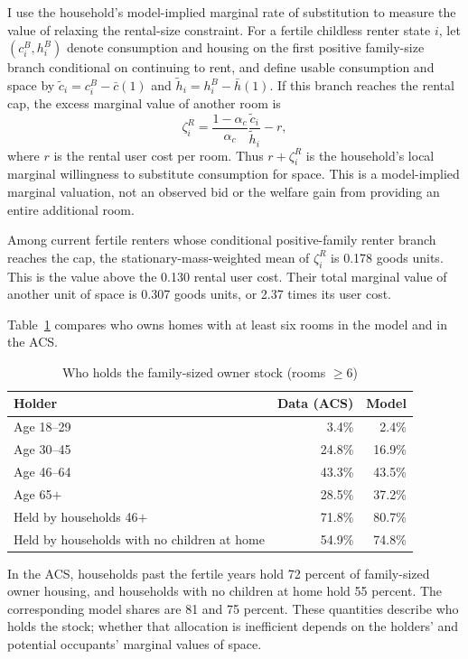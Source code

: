 \documentclass[11pt]{article}
\theoremstyle{definition}
\newcommand{\1}{\mathbf 1}
\begin{document}
I use the household's model-implied marginal rate of substitution to measure
the value of relaxing the rental-size constraint. For a fertile childless
renter state $i$, let $(c_i^B,h_i^B)$ denote consumption and housing on the
first positive family-size branch conditional on continuing to rent, and
define usable consumption and space by
$\widetilde c_i=c_i^B-\bar c(1)$ and
$\widetilde h_i=h_i^B-\bar h(1)$. If this branch reaches the rental cap,
the excess marginal value of another room is
\[
\zeta_i^R
=
\frac{1-\alpha_c}{\alpha_c}
\frac{\widetilde c_i}{\widetilde h_i}-r,
\]
where $r$ is the rental user cost per room. Thus $r+\zeta_i^R$ is the
household's local marginal willingness to substitute consumption for space.
This is a model-implied marginal valuation, not an observed bid or the welfare
gain from providing an entire additional room.

Among current fertile renters whose conditional positive-family renter branch
reaches the cap, the stationary-mass-weighted mean of $\zeta_i^R$ is 0.178
goods units. This is the value above the 0.130 rental user cost. Their total
marginal value of another unit of space is 0.307 goods units, or 2.37 times its
user cost.

Table~\ref{tab:family_stock_holders} compares who owns homes with at least six
rooms in the model and in the ACS.

\begin{table}[H]
\centering
\caption{Who holds the family-sized owner stock (rooms $\ge6$)}
\label{tab:family_stock_holders}
\small
\begin{tabular}{@{}l r r@{}}
\toprule
Holder & Data (ACS) & Model \\
\midrule
Age 18--29 & 3.4\% & 2.4\% \\
Age 30--45 & 24.8\% & 16.9\% \\
Age 46--64 & 43.3\% & 43.5\% \\
Age 65$+$ & 28.5\% & 37.2\% \\
\midrule
Held by households 46$+$ & 71.8\% & 80.7\% \\
Held by households with no children at home & 54.9\% & 74.8\% \\
\bottomrule
\end{tabular}
\end{table}

In the ACS, households past the fertile years hold 72 percent of family-sized
owner housing, and households with no children at home hold 55 percent. The
corresponding model shares are 81 and 75 percent. These quantities describe who
holds the stock; whether that allocation is inefficient depends on the holders'
and potential occupants' marginal values of space.
\end{document}

